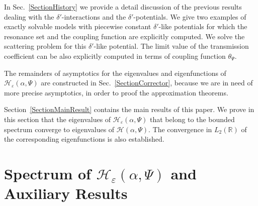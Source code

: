 \documentclass[11pt,english]{amsart}%
\begin{document}
In Sec.~\ref{SectionHistory} we provide a detail discussion of the previous results dealing with
the $\delta'$-interactions and the $\delta'$-potentials.
We give two examples of exactly solvable models with  piecewise constant $\delta'$-like potentials for which
the resonance set and the coupling function are  explicitly computed.
We solve the scattering problem for this $\delta'$-like potential. The limit value of the transmission coefficient
can be also explicitly computed in terms of  coupling function $\theta_\Psi$.

The remainders of asymptotics for the eigenvalues and eigenfunctions of $\mathcal{H}_\varepsilon(\alpha,\Psi)$ are constructed in Sec.~\ref{SectionCorrector}, because we are in need of more precise asymptotics, in order to proof the approximation theorems.

Section~\ref{SectionMainResult} contains the main results of this paper. We prove in this section that the eigenvalues of $\mathcal{H}_\varepsilon(\alpha,\Psi)$ that belong to the bounded spectrum converge to  eigenvalues of $\mathcal{H}(\alpha,\Psi)$. The convergence in $L_2(\mathbb R)$ of the corresponding eigenfunctions is also established.

\section{Spectrum of  $\mathcal{H}_\varepsilon(\alpha,\Psi)$ and  Auxiliary Results}\label{SectionSpectrumStructure}
\end{document}
